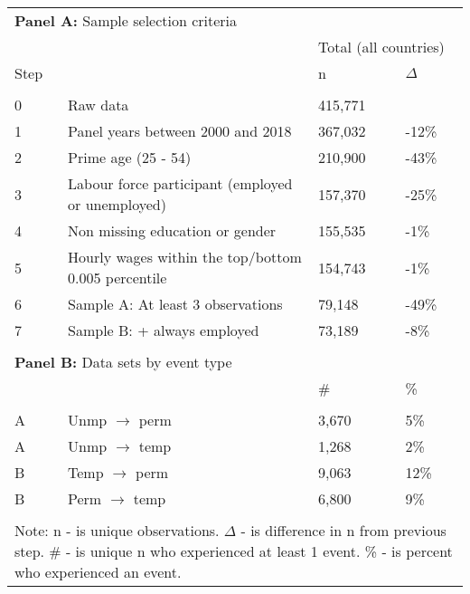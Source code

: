 \begin{tabular}{l>{\raggedright\arraybackslash}p{4in}ll}
   \toprule 
 
\multicolumn{4}{l}{{\bf Panel A:} Sample selection criteria} \\ 

&  & 
\multicolumn{2}{l}{Total (all countries)}
\\  
 
 
\multicolumn{1}{l}{Step} & 
\multicolumn{1}{l}{Description} 
& n & $\Delta$
\\ 
\cmidrule(lr){1-2}
\cmidrule(lr){3-4}
\\[-1.8ex]  
 
0 & Raw data & 415,771 &  \\ 
  1 & Panel years between 2000 and 2018 & 367,032 & -12\% \\ 
  2 & Prime age (25 - 54) & 210,900 & -43\% \\ 
  3 & Labour force participant (employed or unemployed) & 157,370 & -25\% \\ 
  4 & Non missing education or gender & 155,535 & -1\% \\ 
  5 & Hourly wages within the top/bottom 0.005 percentile & 154,743 & -1\% \\ 
  6 & Sample A: At least 3 observations & 79,148 & -49\% \\ 
  7 & Sample B: + always employed & 73,189 & -8\% \\ 
   
\hline \\[-1.8ex]  
 
\multicolumn{4}{l}{{\bf Panel B:} Data sets by event type} \\ 

& & 
\# & \%
\\ 
\cmidrule(lr){1-2}
\cmidrule(lr){3-4}
\\[-1.8ex]  
 
A & Unmp $\rightarrow$ perm & 3,670 & 5\% \\ 
  A & Unmp $\rightarrow$ temp & 1,268 & 2\% \\ 
  B & Temp $\rightarrow$ perm & 9,063 & 12\% \\ 
  B & Perm $\rightarrow$ temp & 6,800 & 9\% \\ 
   \bottomrule \\[-1.8ex] \multicolumn{4}{p{6in}}{Note: n - is unique observations.  $\Delta$ - is difference in n from previous step.  \# - is unique n who experienced at least 1 event.  \% - is percent who experienced an event.} 
\end{tabular}
